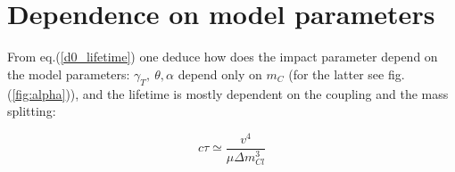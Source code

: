 \documentclass[12pt,letterpaper,notitlepage]{article}
\begin{document}
\section{Dependence on model parameters}

From eq.(\ref{d0_lifetime}) one deduce how does the impact parameter depend on the model parameters: $\gamma_T,\ \theta, \alpha$ depend only on $m_C$ (for the latter see fig.(\ref{fig:alpha})), and the lifetime is mostly dependent on the coupling and the mass splitting:

\begin{equation}
  c \tau \simeq \frac{v^4}{\mu \Delta m_{Cl}^3}
\end{equation}
\end{document}
